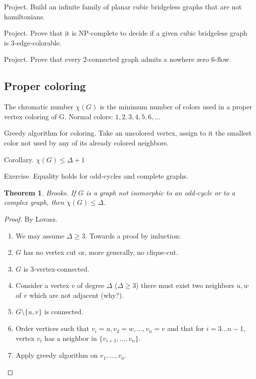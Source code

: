 \documentclass[12pt,a4paper]{article}
\newtheorem{theorem}{Theorem}
\begin{document}
Project. Build an infinite family of planar cubic bridgeless graphs that are not
hamiltonians.

Project. Prove that it is NP-complete to decide if a given cubic bridgeless
graph is 3-edge-colorable.

Project. Prove that every 2-connected graph admits a nowhere zero 6-flow.

\subsection{Proper coloring}

\begin{center}
\end{center}

The chromatic number \(\chi(G)\) is the minimum number of colors used in a
proper vertex coloring of G. Normal colors: \(1, 2, 3, 4, 5, 6, \dots\)

Greedy algorithm for coloring.  Take an uncolored vertex, assign to it the
smallest color not used by any of its already colored neighbors.

Corollary. \(\chi(G) \leq \Delta + 1\)

Exercise. Equality holds for odd-cycles and complete graphs.

\begin{theorem}
  Brooks.  If \(G\) is a graph not isomorphic to an odd-cycle or to a complex
  graph, then \(\chi(G) \leq \Delta\).
\end{theorem}

\begin{proof}
  By Lovasz.

  \begin{enumerate}
  \item We may assume \(\Delta \geq 3\). Towards a proof by induction:
  \item \(G\) has no vertex cut or, more generally, no clique-cut.
  \item \(G\) is \(3\)-vertex-connected.
  \item Consider a vertex \(v\) of degree \(\Delta\) (\(\Delta \geq 3\)) there
    must exist two neighbors \(u, w\) of \(v\) which are not adjacent (why?).
  \item \(G \setminus \{u, v\}\) is connected.
  \item Order vertices such that \(v_i=u, v_2=w, \dots, v_n=v\) and that for
    \(i=3 \dots n-1\), vertex \(v_i\) has a neighbor in
    \(\{v_{i+1}, \dots, v_n\}\).
  \item Apply greedy algorithm on \(v_1, \dots, v_n\).
  \end{enumerate}
\end{proof}
\end{document}
